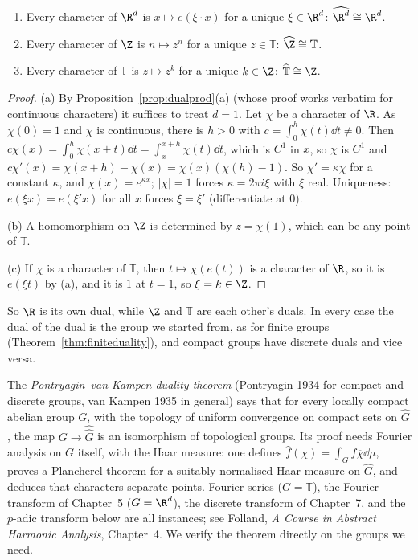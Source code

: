 \begin{theorem}\label{thm:duals}
\begin{enumerate}
\item[(a)] Every character of $\R^d$ is $x\mapsto e(\xi\cdot x)$ for a unique $\xi\in\R^d$: $\widehat{\R^d}\cong\R^d$.
\item[(b)] Every character of $\Z$ is $n\mapsto z^n$ for a unique $z\in\mathbb T$: $\widehat{\Z}\cong\mathbb T$.
\item[(c)] Every character of $\mathbb T$ is $z\mapsto z^k$ for a unique $k\in\Z$: $\widehat{\mathbb T}\cong\Z$.
\end{enumerate}
\end{theorem}
\begin{proof}
(a) By Proposition~\ref{prop:dualprod}(a) (whose proof works verbatim for continuous characters) it suffices to treat $d=1$. Let $\chi$ be a character of $\R$. As $\chi(0)=1$
and $\chi$ is continuous, there is $h>0$ with $c=\int_0^h\chi(t)\dd t\ne0$. Then $c\chi(x)=\int_0^h\chi(x+t)\dd t=\int_x^{x+h}\chi(t)\dd t$, which is $C^1$ in $x$, so $\chi$ is $C^1$ and
$c\chi'(x)=\chi(x+h)-\chi(x)=\chi(x)(\chi(h)-1)$. So $\chi'=\kappa\chi$ for a constant $\kappa$, and $\chi(x)=e^{\kappa x}$; $|\chi|=1$ forces $\kappa=2\pi i\xi$ with $\xi$ real.
Uniqueness: $e(\xi x)=e(\xi'x)$ for all $x$ forces $\xi=\xi'$ (differentiate at $0$).

(b) A homomorphism on $\Z$ is determined by $z=\chi(1)$, which can be any point of $\mathbb T$.

(c) If $\chi$ is a character of $\mathbb T$, then $t\mapsto\chi(e(t))$ is a character of $\R$, so it is $e(\xi t)$ by (a), and it is $1$ at $t=1$, so $\xi=k\in\Z$.
\end{proof}

So $\R$ is its own dual, while $\Z$ and $\mathbb T$ are each other's duals. In every case the dual of the dual is the group we started from, as for finite groups
(Theorem~\ref{thm:finiteduality}), and compact groups have discrete duals and vice versa.

\begin{remark}
The \emph{Pontryagin--van Kampen duality theorem} (Pontryagin 1934 for compact and discrete groups, van Kampen 1935 in general) says that for every locally compact
abelian group $G$, with the topology of uniform convergence on compact sets on $\widehat G$, the map $G\to\widehat{\widehat G}$ is an isomorphism of topological groups. Its proof
needs Fourier analysis on $G$ itself, with the Haar measure: one defines $\hat f(\chi)=\int_Gf\overline\chi\dd\mu$, proves a Plancherel theorem for a suitably normalised Haar measure on
$\widehat G$, and deduces that characters separate points. Fourier series ($G=\mathbb T$), the Fourier transform of Chapter~5 ($G=\R^d$), the discrete transform of Chapter~7, and the
$p$-adic transform below are all instances; see Folland, \emph{A Course in Abstract Harmonic Analysis}, Chapter~4. We verify the theorem directly on the groups we need.
\end{remark}

